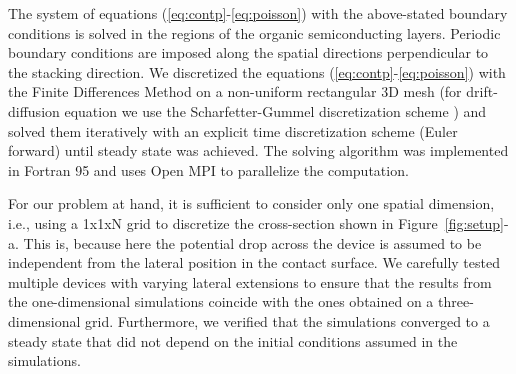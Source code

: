 \documentclass[%
9pt,
 aip,
rsi,%
 amsmath,amssymb,
preprint,%
]{revtex4-1}
\begin{document}
The system of equations (\ref{eq:contp}-\ref{eq:poisson}) with the above-stated boundary conditions is solved in the regions of the organic semiconducting layers. 
Periodic boundary conditions are imposed along the spatial directions perpendicular to the stacking direction.
We discretized the equations (\ref{eq:contp}-\ref{eq:poisson}) with the Finite Differences Method on a non-uniform rectangular 3D mesh (for drift-diffusion equation we use the Scharfetter-Gummel discretization scheme \cite{SG}) and solved them iteratively with an explicit time discretization scheme (Euler forward) until steady state was achieved.
The solving algorithm was implemented in Fortran 95 and uses Open MPI to parallelize the computation. 

For our problem at hand, it is sufficient to consider only one spatial dimension, i.e., using a 1x1xN grid to discretize the cross-section shown in Figure~\ref{fig:setup}-a. 
This is, because here the potential drop across the device is assumed to be independent from the lateral position in the contact surface.
We carefully tested multiple devices with varying lateral extensions to ensure that the results from the one-dimensional simulations coincide with the ones obtained on a three-dimensional grid.
Furthermore, we verified that the simulations converged to a steady state that did not depend on the initial conditions assumed in the simulations.
\end{document}
